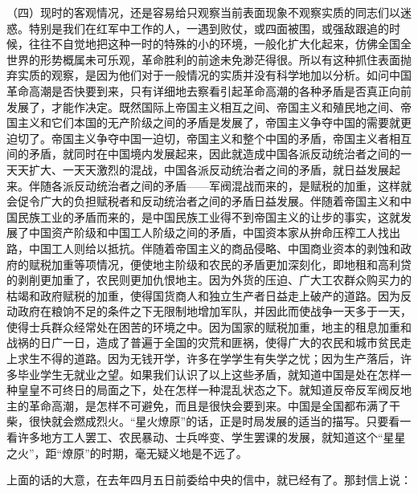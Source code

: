 （四）现时的客观情况，还是容易给只观察当前表面现象不观察实质的同志们以迷惑。特别是我们在红军中工作的人，一遇到败仗，或四面被围，或强敌跟追的时候，往往不自觉地把这种一时的特殊的小的环境，一般化扩大化起来，仿佛全国全世界的形势概属未可乐观，革命胜利的前途未免渺茫得很。所以有这种抓住表面抛弃实质的观察，是因为他们对于一般情况的实质并没有科学地加以分析。如问中国革命高潮是否快要到来，只有详细地去察看引起革命高潮的各种矛盾是否真正向前发展了，才能作决定。既然国际上帝国主义相互之间、帝国主义和殖民地之间、帝国主义和它们本国的无产阶级之间的矛盾是发展了，帝国主义争夺中国的需要就更迫切了。帝国主义争夺中国一迫切，帝国主义和整个中国的矛盾，帝国主义者相互间的矛盾，就同时在中国境内发展起来，因此就造成中国各派反动统治者之间的一天天扩大、一天天激烈的混战，中国各派反动统治者之间的矛盾，就日益发展起来。伴随各派反动统治者之间的矛盾——军阀混战而来的，是赋税的加重，这样就会促令广大的负担赋税者和反动统治者之间的矛盾日益发展。伴随着帝国主义和中国民族工业的矛盾而来的，是中国民族工业得不到帝国主义的让步的事实，这就发展了中国资产阶级和中国工人阶级之间的矛盾，中国资本家从拚命压榨工人找出路，中国工人则给以抵抗。伴随着帝国主义的商品侵略、中国商业资本的剥蚀和政府的赋税加重等项情况，便使地主阶级和农民的矛盾更加深刻化，即地租和高利贷的剥削更加重了，农民则更加仇恨地主。因为外货的压迫、广大工农群众购买力的枯竭和政府赋税的加重，使得国货商人和独立生产者日益走上破产的道路。因为反动政府在粮饷不足的条件之下无限制地增加军队，并因此而使战争一天多于一天，使得士兵群众经常处在困苦的环境之中。因为国家的赋税加重，地主的租息加重和战祸的日广一日，造成了普遍于全国的灾荒和匪祸，使得广大的农民和城市贫民走上求生不得的道路。因为无钱开学，许多在学学生有失学之忧；因为生产落后，许多毕业学生无就业之望。如果我们认识了以上这些矛盾，就知道中国是处在怎样一种皇皇不可终日的局面之下，处在怎样一种混乱状态之下。就知道反帝反军阀反地主的革命高潮，是怎样不可避免，而且是很快会要到来。中国是全国都布满了干柴，很快就会燃成烈火。“星火燎原”的话，正是时局发展的适当的描写。只要看一看许多地方工人罢工、农民暴动、士兵哗变、学生罢课的发展，就知道这个“星星之火”，距“燎原”的时期，毫无疑义地是不远了。

上面的话的大意，在去年四月五日前委给中央的信中，就已经有了。那封信上说：

